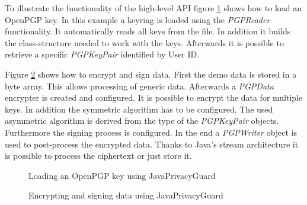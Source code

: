 To illustrate the functionality of the high-level API figure \ref{fig:jpg:key} shows how to load an OpenPGP key. In this example a keyring is loaded using the \textit{PGPReader} functionality. It automatically reads all keys from the file. In addition it builds the class-structure needed to work with the keys. Afterwards it is possible to retrieve a specific \textit{PGPKeyPair} identified by User ID.

Figure \ref{fig:jpg:enc} shows how to encrypt and sign data. First the demo data is stored in a byte array. This allows processing of generic data. Afterwards a \textit{PGPData} encrypter is created and configured. It is possible to encrypt the data for multiple keys. In addition the symmetric algorithm has to be configured. The used asymmetric algorithm is derived from the type of the \textit{PGPKeyPair} objects. Furthermore the signing process is configured.  In the end a \textit{PGPWriter} object is used to post-process the encrypted data. Thanks to Java's stream architecture it is possible to process the ciphertext or just store it.

\begin{figure}[p]
	\centering
	
	\caption{Loading an OpenPGP key using JavaPrivacyGuard}
	\label{fig:jpg:key}
\end{figure}

\begin{figure}[p]
	\centering
	
	\caption{Encrypting and signing data using JavaPrivacyGuard}
	\label{fig:jpg:enc}
\end{figure}


%
%
%
%
%
%

